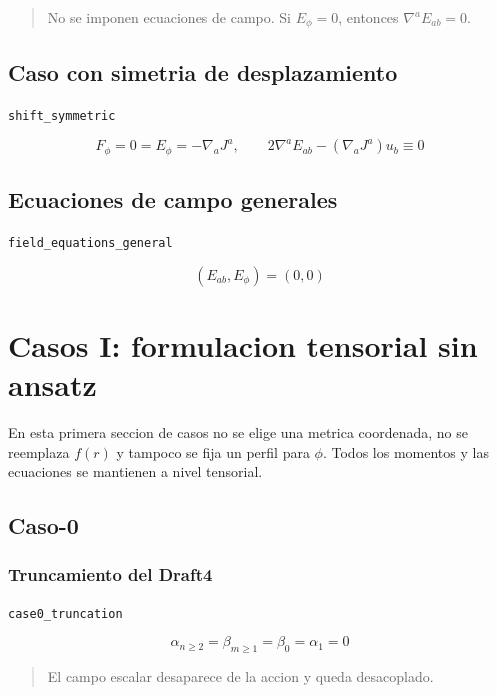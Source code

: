 \documentclass[11pt,a4paper]{article}
\begin{document}
\begin{quote}\small No se imponen ecuaciones de campo. Si \(E_\phi=0\), entonces \(\nabla^aE_{ab}=0\).\end{quote}

\subsection{Caso con simetria de desplazamiento}

\noindent\texttt{shift\_symmetric}\par\nopagebreak[4]

\[
F_\phi=0 = E_\phi=-\nabla_aJ^a,\qquad 2\nabla^aE_{ab}-(\nabla_aJ^a)u_b\equiv0
\]

\subsection{Ecuaciones de campo generales}

\noindent\texttt{field\_equations\_general}\par\nopagebreak[4]

\[
(E_{ab},E_\phi) = (0,0)
\]

\section{Casos I: formulacion tensorial sin ansatz}

En esta primera seccion de casos no se elige una metrica coordenada, no se reemplaza $f(r)$ y tampoco se fija un perfil para $\phi$. Todos los momentos y las ecuaciones se mantienen a nivel tensorial.

\subsection{Caso-0}

\subsubsection{Truncamiento del Draft4}

\noindent\texttt{case0\_truncation}\par\nopagebreak[4]

\[
\alpha_{n\ge2}=\beta_{m\ge1}=\beta_0=\alpha_1 = 0
\]

\begin{quote}\small El campo escalar desaparece de la accion y queda desacoplado.\end{quote}
\end{document}
